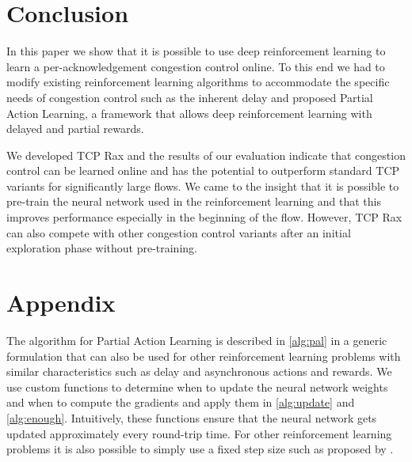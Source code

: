 \documentclass[newfonts=false,format=sigconf,10pt,letterpaper]{acmart}
\begin{document}
\section{Conclusion}

In this paper we show that it is possible to use deep reinforcement learning to learn a per-acknowledgement congestion control online. To this end we had to modify existing reinforcement learning algorithms to accommodate the specific needs of congestion control such as the inherent delay and proposed Partial Action Learning, a framework that allows deep reinforcement learning with delayed and partial rewards. 

We developed TCP Rax and the results of our evaluation indicate that congestion control can be learned online and has the potential to outperform standard TCP variants for significantly large flows. We came to the insight that it is possible to pre-train the neural network used in the reinforcement learning and that this improves performance especially in the beginning of the flow. However, TCP Rax can also compete with other congestion control variants after an initial exploration phase without pre-training.

\section*{Appendix}	

The algorithm for Partial Action Learning is described in \autoref{alg:pal} in a generic formulation that can also be used for other reinforcement learning problems with similar characteristics such as delay and asynchronous actions and rewards. We use custom functions to determine when to update the neural network weights and when to compute the gradients and apply them in \autoref{alg:update} and \autoref{alg:enough}. Intuitively, these functions ensure that the neural network gets updated approximately every round-trip time. For other reinforcement learning problems it is also possible to simply use a fixed step size such as proposed by \cite{mnih_asynchronous_2016}.
\end{document}
